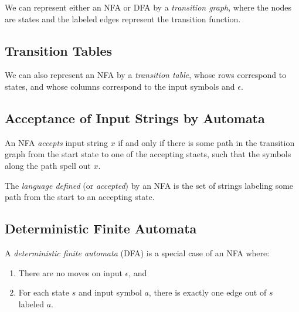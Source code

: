 \documentclass[a4paper,twoside]{book}
\begin{document}
We can represent either an NFA or DFA by a \textit{transition graph}, where the nodes are states and the labeled edges represent the transition function.

\subsection{Transition Tables}

We can also represent an NFA by a \textit{transition table}, whose rows correspond to states, and whose columns correspond to the input symbols and $\epsilon$.

\subsection{Acceptance of Input Strings by Automata}

An NFA \textit{accepts} input string $x$ if and only if there is some path in the transition graph from the start state to one of the accepting staets, such that the symbols along the path spell out $x$.

The \textit{language defined} (or \textit{accepted}) by an NFA is the set of strings labeling some path from the start to an accepting state.

\subsection{Deterministic Finite Automata}

A \textit{deterministic finite automata} (DFA) is a special case of an NFA where:
\begin{enumerate}
    \item There are no moves on input $\epsilon$, and
    \item For each state $s$ and input symbol $a$, there is exactly one edge out of $s$ labeled $a$.
\end{enumerate}

\end{document}
